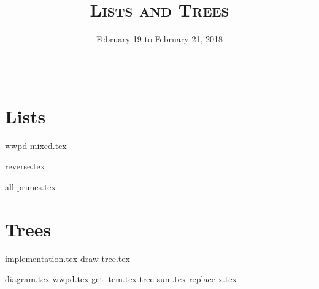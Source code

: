 \documentclass{exam}
\title{\textsc{Lists and Trees}}
\date{February 19 to February 21, 2018}
\begin{document}
\maketitle
\rule{\textwidth}{0.15em}
\fontsize{12}{15}\selectfont


\section{Lists}
\begin{questions}
{wwpd-mixed.tex}

\begin{blocksection}
{reverse.tex}
\end{blocksection}

\newpage
\begin{blocksection}
{all-primes.tex}
\end{blocksection}
\end{questions}

\newpage
\section{Trees}
{implementation.tex}
\vspace{2\baselineskip}
{draw-tree.tex}
\newpage
\begin{questions}
{diagram.tex}
{wwpd.tex}
\vspace{2\baselineskip}
{get-item.tex}
{tree-sum.tex}
\newpage
{replace-x.tex}

\end{questions}
\end{document}

